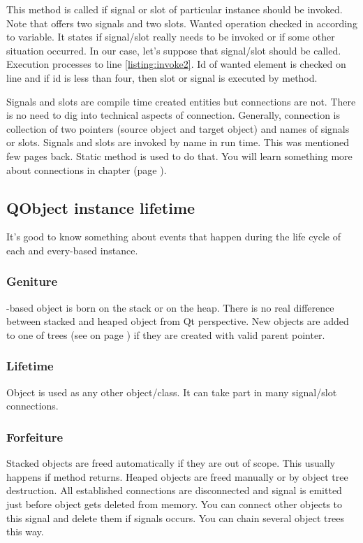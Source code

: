 This method is called if signal or slot of particular instance should be invoked. Note that offers two signals and two slots. Wanted operation checked in according to variable. It states if signal/slot really needs to be invoked or if some other situation occurred. In our case, let's suppose that signal/slot should be called. Execution processes to line \ref{listing:invoke2}. Id of wanted element is checked on line and if id is less than four, then slot or signal is executed by method.

Signals and slots are compile time created entities but connections are not. There is no need to dig into technical aspects of connection. Generally, connection is collection of two pointers (source object and target object) and names of signals or slots. Signals and slots are invoked by name in run time. This was mentioned few pages back. Static method is used to do that. \citep[QMetaObject class]{various:qtdoc}  You will learn something more about connections in chapter  (page \pageref{section:thread}).



\subsection{QObject instance lifetime}
It's good to know something about events that happen during the life cycle of each and every-based instance.

\subsubsection*{Geniture}
-based object is born on the stack or on the heap. There is no real difference between stacked and heaped object from Qt perspective. New objects are added to one of trees (see  on page \pageref{section:model}) if they are created with valid parent pointer.

\subsubsection*{Lifetime}
Object is used as any other \cpp object/class. It can take part in many signal/slot connections.

\subsubsection*{Forfeiture}
Stacked objects are freed automatically if they are out of scope. This usually happens if method returns. Heaped objects are freed manually or by object tree destruction. All established connections are disconnected and signal is emitted just before object gets deleted from memory. You can connect other objects to this signal and delete them if signals occurs. You can chain several object trees this way.